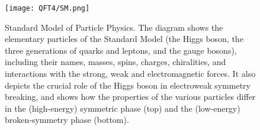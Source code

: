 \begin{figure}[!h]
	\centering
	\texttt{[image: QFT4/SM.png]}
	\caption{Standard Model of Particle Physics. The diagram shows the elementary particles of the Standard Model (the Higgs boson, the three generations of quarks and leptons, and the gauge bosons), including their names, masses, spins, charges, chiralities, and interactions with the strong, weak and electromagnetic forces. It also depicts the crucial role of the Higgs boson in electroweak symmetry breaking, and shows how the properties of the various particles differ in the (high-energy) symmetric phase (top) and the (low-energy) broken-symmetry phase (bottom).}
\end{figure}

